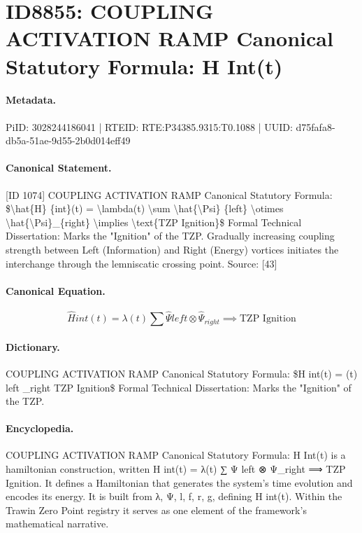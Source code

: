 \section*{ID8855: COUPLING ACTIVATION RAMP Canonical Statutory Formula: H Int(t)}
\paragraph{Metadata.}
PiID: 3028244186041 | RTEID: RTE:P34385.9315:T0.1088 | UUID: d75fafa8-db5a-51ae-9d55-2b0d014eff49

\paragraph{Canonical Statement.}
[ID 1074] COUPLING ACTIVATION RAMP Canonical Statutory Formula: \$\textbackslash{}hat\{H\} \{int\}(t) = \textbackslash{}lambda(t) \textbackslash{}sum \textbackslash{}hat\{\textbackslash{}Psi\} \{left\} \textbackslash{}otimes \textbackslash{}hat\{\textbackslash{}Psi\}\_\{right\} \textbackslash{}implies \textbackslash{}text\{TZP Ignition\}\$ Formal Technical Dissertation: Marks the "Ignition" of the TZP. Gradually increasing coupling strength between Left (Information) and Right (Energy) vortices initiates the interchange through the lemniscatic crossing point. Source: [43]

\paragraph{Canonical Equation.}
\[
\hat{H} {int}(t) = \lambda(t) \sum \hat{\Psi} {left} \otimes \hat{\Psi}_{right} \implies \text{TZP Ignition}
\]

\paragraph{Dictionary.}
COUPLING ACTIVATION RAMP Canonical Statutory Formula: \$H int(t) = (t) left \_right TZP Ignition\$ Formal Technical Dissertation: Marks the "Ignition" of the TZP.

\paragraph{Encyclopedia.}
COUPLING ACTIVATION RAMP Canonical Statutory Formula: H Int(t) is a hamiltonian construction, written H int(t) = λ(t) ∑ Ψ left ⊗ Ψ\_right ⟹ TZP Ignition. It defines a Hamiltonian that generates the system's time evolution and encodes its energy. It is built from λ, Ψ, l, f, r, g, defining H int(t). Within the Trawin Zero Point registry it serves as one element of the framework's mathematical narrative.

